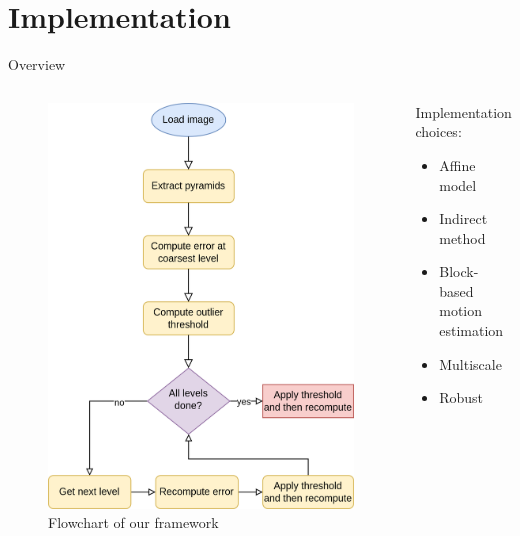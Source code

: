 \documentclass[aspectratio=1610,xcolor=dvipsnames]{beamer}
\begin{document}
\section{Implementation}
\begin{frame}{Overview}
    \begin{columns}
        \begin{column}{0.45\textwidth}
            \begin{figure}[H]
                \includegraphics[keepaspectratio,width=.8\textwidth]{images/implementation-flow.png}
                \caption{Flowchart of our framework}
            \end{figure}
        \end{column}
        \begin{column}{0.45\textwidth}
            Implementation choices:
            \begin{itemize}
                \item Affine model
                \item Indirect method
                \item Block-based motion estimation
                \item Multiscale
                \item Robust
            \end{itemize}
        \end{column}
    \end{columns}
\end{frame}
\end{document}
